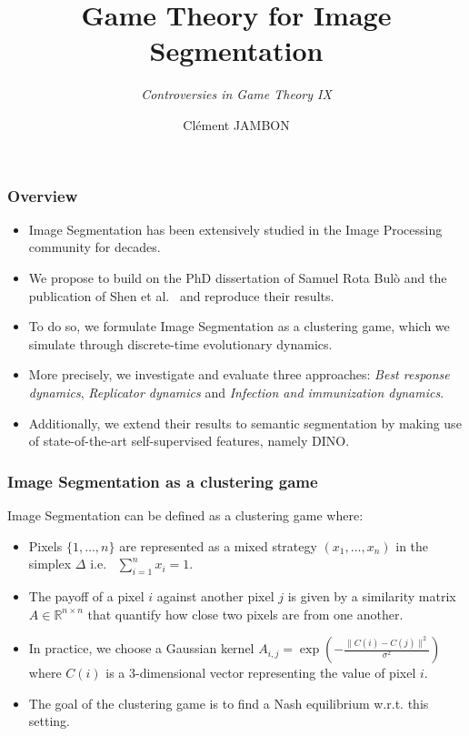 \documentclass{beamer}
\title{Game Theory for Image Segmentation}
\subtitle{\textit{Controversies in Game Theory IX}}
\author[Clément JAMBON]{Clément JAMBON}
\institute[]{ETH Zürich}
\begin{document}
\frame{\titlepage}

\begin{frame}
    \frametitle{Overview}

    \begin{itemize}
        \item Image Segmentation has been extensively studied in the Image Processing community for decades.
        \item We propose to build on the PhD dissertation of Samuel Rota Bulò\cite{bulo-thesis} and the publication of Shen et al.~\cite{game-clustering} and reproduce their results.
        \item To do so, we formulate Image Segmentation as a clustering game, which we simulate through discrete-time evolutionary dynamics.
        \item More precisely, we investigate and evaluate three approaches: \textit{Best response dynamics}, \textit{Replicator dynamics} and \textit{Infection and immunization dynamics}\cite{inimdyn}.
        \item Additionally, we extend their results to semantic segmentation by making use of state-of-the-art self-supervised features, namely DINO\cite{dino}.
    \end{itemize}

\end{frame}

\begin{frame}
    \frametitle{Image Segmentation as a clustering game}
    Image Segmentation can be defined as a clustering game where:
    \begin{itemize}
        \item Pixels $\{1, \ldots, n\}$ are represented as a mixed strategy $(x_1, \ldots, x_n)$ in the simplex $\Delta$ i.e.~ $\sum_{i=1}^nx_i=1$.
        \item The payoff of a pixel $i$ against another pixel $j$ is given by a similarity matrix $A\in\mathbb{R}^{n\times n}$ that quantify how close two pixels are from one another.
        \item In practice, we choose a Gaussian kernel $A_{i, j}=\exp\left(-\frac{\lVert C(i) - C(j)\rVert^2}{\sigma^2}\right)$ where $C(i)$ is a 3-dimensional vector representing the value of pixel $i$.
        \item The goal of the clustering game is to find a Nash equilibrium w.r.t. this setting.
    \end{itemize}
\end{frame}
\end{document}
